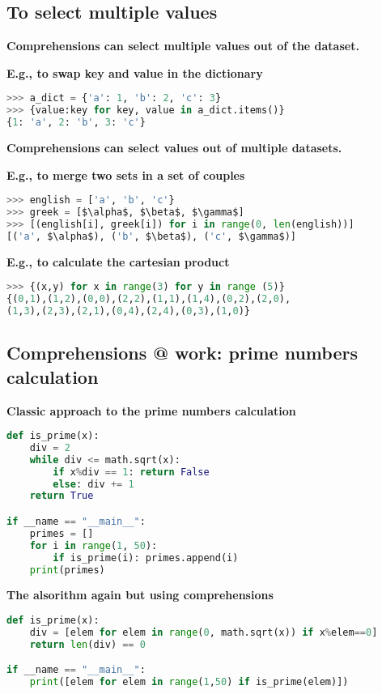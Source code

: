 \subsection{To select multiple values}
\textbf{Comprehensions can select multiple values out of the dataset.}

\textbf{E.g., to swap key and value in the dictionary}
\begin{lstlisting}[language=Python]
>>> a_dict = {'a': 1, 'b': 2, 'c': 3}
>>> {value:key for key, value in a_dict.items()}
{1: 'a', 2: 'b', 3: 'c'}
\end{lstlisting}
\textbf{Comprehensions can select values out of multiple datasets.}

\textbf{E.g., to merge two sets in a set of couples}
\begin{lstlisting}[language=Python]
>>> english = ['a', 'b', 'c'}
>>> greek = [$\alpha$, $\beta$, $\gamma$]
>>> [(english[i], greek[i]) for i in range(0, len(english))]
[('a', $\alpha$), ('b', $\beta$), ('c', $\gamma$)]
\end{lstlisting}


\textbf{E.g., to calculate the cartesian product}
\begin{lstlisting}[language=Python]
>>> {(x,y) for x in range(3) for y in range (5)}
{(0,1),(1,2),(0,0),(2,2),(1,1),(1,4),(0,2),(2,0),
(1,3),(2,3),(2,1),(0,4),(2,4),(0,3),(1,0)}
\end{lstlisting}

\subsection{Comprehensions @ work: prime numbers calculation}
\textbf{Classic approach to the prime numbers calculation}
\begin{lstlisting}[language=Python]
def is_prime(x):
	div = 2
	while div <= math.sqrt(x):
		if x%div == 1: return False		
		else: div += 1
	return True

if __name == "__main__":
	primes = []
	for i in range(1, 50):
		if is_prime(i): primes.append(i)
	print(primes)
\end{lstlisting}
\textbf{The alsorithm again but using comprehensions}
\begin{lstlisting}[language=Python]
def is_prime(x):	
	div = [elem for elem in range(0, math.sqrt(x)) if x%elem==0]
	return len(div) == 0

if __name == "__main__":
	print([elem for elem in range(1,50) if is_prime(elem)])
\end{lstlisting}

